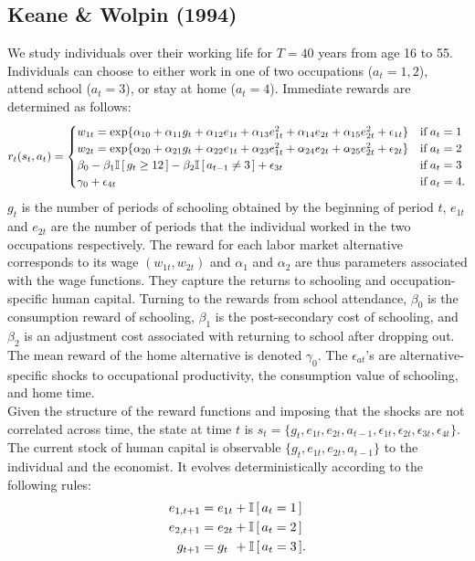 \subsection{Keane \& Wolpin (1994)}
We study individuals over their working life for $T = 40$ years from age 16 to 55. Individuals can choose to either work in one of two occupations ($a_t = 1, 2$), attend school ($a_t = 3$), or stay at home ($a_t = 4$). Immediate rewards are determined as follows:
%
\begin{align*}
r_t(s_t, a_t) = \begin{cases} w_{1t} =
\exp\{\alpha_{10} + \alpha_{11}g_t + \alpha_{12}e_{1t} + \alpha_{13}e^2_{1t} + \alpha_{14}e_{2t} + \alpha_{15}e^2_{2t} + \epsilon_{1t}\} & \text{if}\; a_t = 1 \\
w_{2t} = \exp\{\alpha_{20} + \alpha_{21}g_t + \alpha_{22}e_{1t} + \alpha_{23}e^2_{1t} + \alpha_{24}e_{2t} + \alpha_{25}e^2_{2t} + \epsilon_{2t}\}& \text{if}\; a_t = 2 \\
\beta_0 - \beta_1 \mathbb{I}\,[\,g_t \geq 12\,] - \beta_2\mathbb{I}\,[\,a_{t - 1} \neq 3\,] + \epsilon_{3t}& \text{if}\; a_t = 3 \\
\gamma_0 + \epsilon_{4t}& \text{if}\; a_t = 4. \\
\end{cases}
\end{align*}
%
$g_t$ is the number of periods of schooling obtained by the beginning of period $t$, $e_{1t}$ and $e_{2t}$ are the number of periods that the individual worked in the two occupations respectively. The reward for each labor market alternative corresponds to its wage $(w_{1t}, w_{2t})$ and $\alpha_{1}$ and $\alpha_{2}$ are thus parameters associated with the wage functions. They capture the returns to schooling and occupation-specific human capital. Turning to the rewards from school attendance, $\beta_0$ is the consumption reward of schooling, $\beta_1$ is the post-secondary cost of schooling, and $\beta_2$ is an adjustment cost associated with returning to school after dropping out. The mean reward of the home alternative is denoted $\gamma_0$. The $\epsilon_{at}$'s are alternative-specific shocks to occupational productivity, the consumption value of schooling, and home time.\\

\noindent Given the structure of the reward functions and imposing that the shocks are not correlated across time, the state at time $t$ is $s_t = \{g_t,e_{1t},e_{2t},a_{t - 1},\epsilon_{1t},\epsilon_{2t},\epsilon_{3t},\epsilon_{4t}\}$.
%
The current stock of human capital is observable $\{g_t,e_{1t},e_{2t},a_{t - 1}\}$ to the individual and the economist. It evolves deterministically according to the following rules:
%
\begin{align*}
    e_{1,t+1} &= e_{1t} + \mathbb{I}\,[\,a_t = 1\,] \\
    e_{2,t+1} &= e_{2t} + \mathbb{I}\,[\,a_t = 2\,] \\
    g_{t+1}   &= g_{t\phantom{2}}    +  \mathbb{I}\,[\,a_t = 3\,].
\end{align*}

